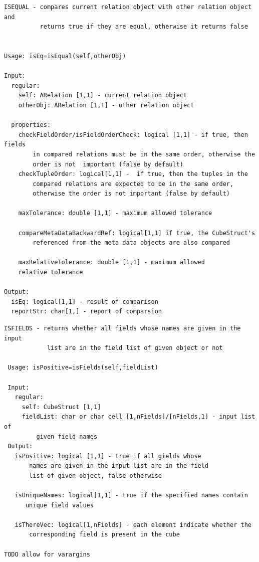 \documentclass[letterpaper,10pt,english]{sphinxmanual}
\begin{document}
\begin{Verbatim}[commandchars=\\\{\}]
ISEQUAL - compares current relation object with other relation object and
          returns true if they are equal, otherwise it returns false


Usage: isEq=isEqual(self,otherObj)

Input:
  regular:
    self: ARelation [1,1] - current relation object
    otherObj: ARelation [1,1] - other relation object

  properties:
    checkFieldOrder/isFieldOrderCheck: logical [1,1] - if true, then fields
        in compared relations must be in the same order, otherwise the
        order is not  important (false by default)
    checkTupleOrder: logical[1,1] -  if true, then the tuples in the
        compared relations are expected to be in the same order,
        otherwise the order is not important (false by default)

    maxTolerance: double [1,1] - maximum allowed tolerance

    compareMetaDataBackwardRef: logical[1,1] if true, the CubeStruct's
        referenced from the meta data objects are also compared

    maxRelativeTolerance: double [1,1] - maximum allowed
    relative tolerance

Output:
  isEq: logical[1,1] - result of comparison
  reportStr: char[1,] - report of comparsion
\end{Verbatim}

\begin{Verbatim}[commandchars=\\\{\}]
 ISFIELDS - returns whether all fields whose names are given in the input
            list are in the field list of given object or not

 Usage: isPositive=isFields(self,fieldList)

 Input:
   regular:
     self: CubeStruct [1,1]
     fieldList: char or char cell [1,nFields]/[nFields,1] - input list of
         given field names
 Output:
   isPositive: logical [1,1] - true if all gields whose
       names are given in the input list are in the field
       list of given object, false otherwise

   isUniqueNames: logical[1,1] - true if the specified names contain
      unique field values

   isThereVec: logical[1,nFields] - each element indicate whether the
       corresponding field is present in the cube

TODO allow for varargins
\end{Verbatim}
\end{document}
